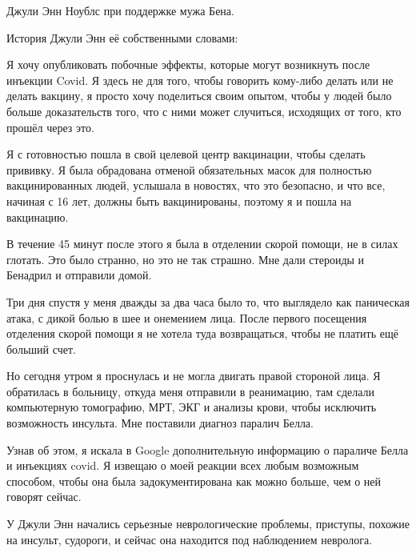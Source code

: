 Джули Энн Ноублс при поддержке мужа Бена.

История Джули Энн её собственными словами:

Я хочу опубликовать побочные эффекты, которые могут возникнуть после инъекции
Covid. Я здесь не для того, чтобы говорить кому-либо делать или не делать
вакцину, я просто хочу поделиться своим опытом, чтобы у людей было больше
доказательств того, что с ними может случиться, исходящих от того, кто прошёл
через это.

Я с готовностью пошла в свой целевой центр вакцинации, чтобы сделать прививку. Я
была обрадована отменой обязательных масок для полностью вакцинированных людей,
услышала в новостях, что это безопасно, и что все, начиная с 16 лет, должны быть
вакцинированы, поэтому я и пошла на вакцинацию.

В течение 45 минут после этого я была в отделении скорой помощи, не в силах
глотать. Это было странно, но это не так страшно. Мне дали стероиды и Бенадрил и
отправили домой.

Три дня спустя у меня дважды за два часа было то, что выглядело как паническая
атака, с дикой болью в шее и онемением лица. После первого посещения отделения
скорой помощи я не хотела туда возвращаться, чтобы не платить ещё больший счет.

Но сегодня утром я проснулась и не могла двигать правой стороной лица. Я
обратилась в больницу, откуда меня отправили в реанимацию, там сделали
компьютерную томографию, МРТ, ЭКГ и анализы крови, чтобы исключить возможность
инсульта. Мне поставили диагноз паралич Белла.

Узнав об этом, я искала в Google дополнительную информацию о параличе Белла и
инъекциях covid. Я извещаю о моей реакции всех любым возможным способом, чтобы
она была задокументирована как можно больше, чем о ней говорят сейчас.

У Джули Энн начались серьезные неврологические проблемы, приступы, похожие на
инсульт, судороги, и сейчас она находится под наблюдением невролога.

